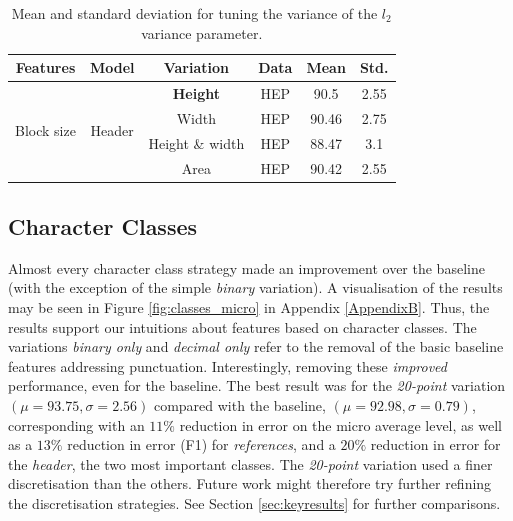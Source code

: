 \begin{table}[h]
\begin{center}
\begin{tabular}{|c|c|c|c|c|c|}
\hline
Features & Model & Variation & Data & Mean & Std.\\
\hline
\multirow{4}{*}{Block size} & \multirow{4}{*}{Header} & \textbf{Height} & HEP & 90.5 & 2.55\\\cline{3-6}
& & Width & HEP & 90.46 & 2.75\\\cline{3-6}
& & Height \& width & HEP  & 88.47 & 3.1\\\cline{3-6}
& & Area & HEP  & 90.42 & 2.55\\\cline{3-6}
\hline
\end{tabular}
\caption[Mean and standard deviation for subsampling CORA data set.]{Mean and standard deviation for tuning the variance of the $l_2$ variance parameter.}
\label{table:blockshaperesults}
\end{center}
\end{table}

\subsection{Character Classes}

Almost every character class strategy made an improvement over the baseline (with the exception of the simple \emph{binary} variation). A visualisation of the results may be seen in Figure \ref{fig:classes_micro} in Appendix \ref{AppendixB}. Thus, the results support our intuitions about features based on character classes. The variations \emph{binary only} and \emph{decimal only} refer to the removal of the basic baseline features addressing punctuation. Interestingly, removing these \emph{improved} performance, even for the baseline. The best result was for the \emph{20-point} variation $(\mu = 93.75, \sigma = 2.56)$ compared with the baseline, $(\mu = 92.98, \sigma = 0.79)$, corresponding with an $11\%$ reduction in error on the micro average level, as well as a $13\%$ reduction in error (F1) for \emph{references}, and a $20\%$ reduction in error for the \emph{header}, the two most important classes. The \emph{20-point} variation used a finer discretisation than the others. Future work might therefore try further refining the discretisation strategies. See Section \ref{sec:keyresults} for further comparisons.


